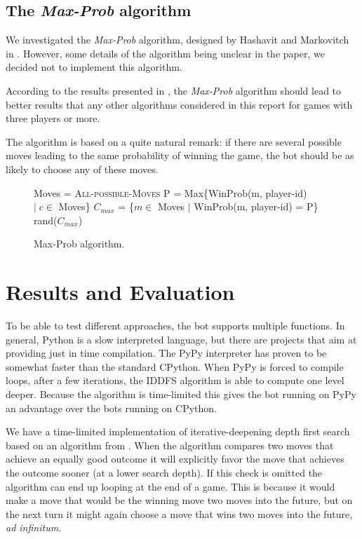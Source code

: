 \documentclass[a4paper,11pt]{article}
\begin{document}
\subsection{The \textit{Max-Prob} algorithm}
We investigated the \textit{Max-Prob} algorithm, designed by Hashavit and
Markovitch in \cite{Hashavit}. However, some details of the algorithm being
unclear in the paper, we decided not to implement this algorithm.

According to the results presented in \cite{Hashavit}, the \textit{Max-Prob}
algorithm should lead to better results that any other algorithms considered
in this report for games with three players or more.

The algorithm is based on a quite natural remark: if there are several
possible moves leading to the same probability of winning the game, the bot
should be as likely to choose any of these moves.

\begin{figure}
\begin{algorithmic}
\State Moves = \textsc{All-possible-Moves}
\State P = Max\{WinProb(m, player-id) $| \; c \in$ Moves\}
\State $C_{max}$ = \{$m \in$ Moves $|$ WinProb(m, player-id) = P\}
\State \Return rand($C_{max}$)
\EndFunction
\end{algorithmic}
\caption{Max-Prob algorithm.}
\end{figure}

\section{Results and Evaluation}

To be able to test different approaches, the bot supports multiple
functions. In general, Python is a slow interpreted language, but
there are projects that aim at providing just in time compilation. The
PyPy interpreter has proven to be somewhat faster than the standard
CPython. When PyPy is forced to compile loops, after a few iterations,
the IDDFS algorithm is able to compute one level deeper. Because the
algorithm is time-limited this gives the bot running on PyPy an
advantage over the bots running on CPython.

We have a time-limited implementation of iterative-deepening depth
first search based on an algorithm from \cite{aimodern}. When the
algorithm compares two moves that achieve an equally good outcome it
will explicitly favor the move that achieves the outcome sooner (at a
lower search depth). If this check is omitted the algorithm can end up
looping at the end of a game. This is because it would make a move
that would be the winning move two moves into the future, but on the
next turn it might again choose a move that wins two moves into the
future, \emph{ad infinitum}.
\end{document}
